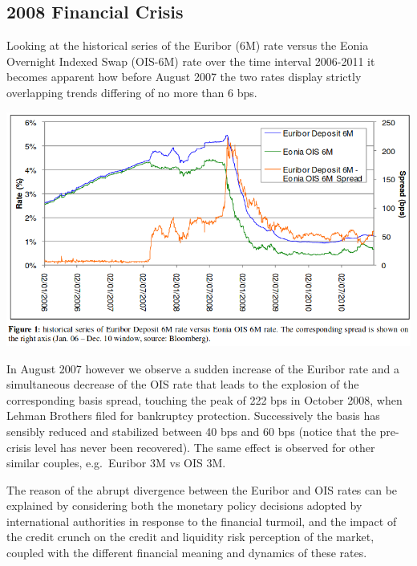 \hypertarget{financial-crisis}{%
\subsection{2008 Financial Crisis}\label{financial-crisis}}

Looking at the historical series of the Euribor (6M) rate versus the
Eonia Overnight Indexed Swap (OIS-6M) rate over the time interval
2006-2011 it becomes apparent how before August 2007 the two rates
display strictly overlapping trends differing of no more than 6 bps.

\includegraphics{credit_crunch.png}

In August 2007 however we observe a sudden increase of the Euribor rate
and a simultaneous decrease of the OIS rate that leads to the explosion
of the corresponding basis spread, touching the peak of 222 bps in
October 2008, when Lehman Brothers filed for bankruptcy protection.
Successively the basis has sensibly reduced and stabilized between 40
bps and 60 bps (notice that the pre-crisis level has never been
recovered). The same effect is observed for other similar couples,
e.g.~Euribor 3M vs OIS 3M.

The reason of the abrupt divergence between the Euribor and OIS rates
can be explained by considering both the monetary policy decisions
adopted by international authorities in response to the financial
turmoil, and the impact of the credit crunch on the credit and liquidity
risk perception of the market, coupled with the different financial
meaning and dynamics of these rates.

